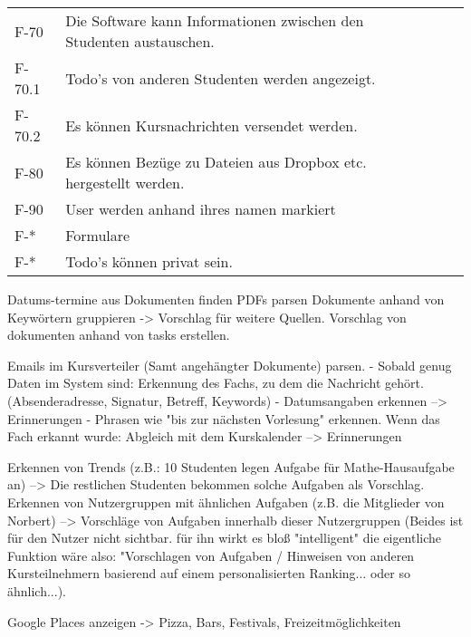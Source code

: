 \begin{table}[H]
\begin{tabularx}{\textwidth}{|l|X|l|l|}
        F-70 & Die Software kann Informationen zwischen den Studenten austauschen. & & \\
        F-70.1 & Todo's von anderen Studenten werden angezeigt. & &\\
        F-70.2 & Es können Kursnachrichten versendet werden. & &\\
        F-80 & Es können Bezüge zu Dateien aus Dropbox etc. hergestellt werden. & &\\
        F-90 & User werden anhand ihres namen markiert & &\\ %

        F-* & Formulare & &\\

        F-* & Todo's können privat sein. & & \\

        




        \hline
    \end{tabularx}

\end{table}

Datums-termine aus Dokumenten finden %
PDFs parsen %
Dokumente anhand von Keywörtern gruppieren -> Vorschlag für weitere Quellen. %
Vorschlag von dokumenten anhand von tasks erstellen. %

Emails im Kursverteiler (Samt angehängter Dokumente) parsen. %
    - Sobald genug Daten im System sind: Erkennung des Fachs, zu dem die Nachricht gehört. (Absenderadresse, Signatur, Betreff, Keywords) %
    - Datumsangaben erkennen --> Erinnerungen %
    - Phrasen wie "bis zur nächsten Vorlesung" erkennen. Wenn das Fach erkannt wurde: Abgleich mit dem Kurskalender --> Erinnerungen %

Erkennen von Trends (z.B.: 10 Studenten legen Aufgabe für Mathe-Hausaufgabe an)
    --> Die restlichen Studenten bekommen solche Aufgaben als Vorschlag. %
Erkennen von Nutzergruppen mit ähnlichen Aufgaben (z.B. die Mitglieder von Norbert)
    --> Vorschläge von Aufgaben innerhalb dieser Nutzergruppen %
(Beides ist für den Nutzer nicht sichtbar. für ihn wirkt es bloß "intelligent" die eigentliche 
Funktion wäre also: "Vorschlagen von Aufgaben / Hinweisen von anderen Kursteilnehmern basierend
auf einem personalisierten Ranking... oder so ähnlich...).

Google Places anzeigen -> Pizza, Bars, Festivals, Freizeitmöglichkeiten %

